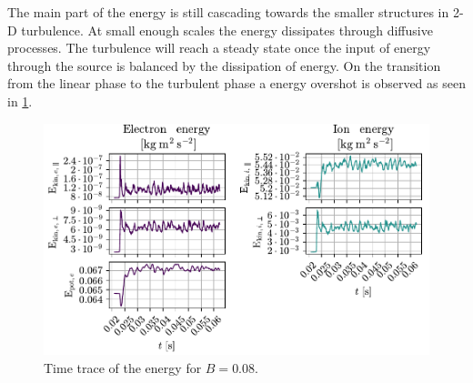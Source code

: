 The main part of the energy is still cascading towards the smaller structures in 2-D turbulence.
At small enough scales the energy dissipates through diffusive processes.
The turbulence will reach a steady state once the input of energy through the source is balanced by the dissipation of energy.
On the transition from the linear phase to the turbulent phase a energy overshot is observed as seen in \cref{fig:energyTrace008}.
%
\begin{figure}[htb]
    \centering
    \includegraphics[width=1.0\textwidth]{fig/results/energyTrace/energyTraceB008}
    \caption{Time trace of the energy for $B=0.08$.}
    \label{fig:energyTrace008}
\end{figure}

